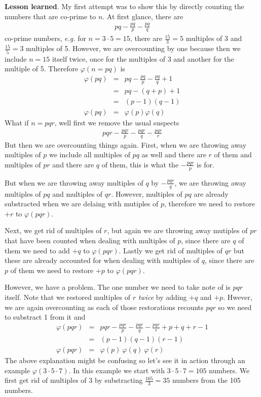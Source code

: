 \documentclass[aps,preprint,preprintnumbers,nofootinbib,showpacs,prd]{revtex4-1}
\newcommand{\eg}{{\it e.g.} }
\newcommand{\nbea}{\begin{eqnarray*}}
\newcommand{\neea}{\end{eqnarray*}}
\begin{document}
{\bf Lesson learned}. My first attempt was to show this by directly counting the numbers that are co-prime to $n$. At first glance, there are
%
\nbea
pq - \frac{pq}{p} - \frac{pq}{q}
\neea
%
co-prime numbers, \eg for $n=3\cdot 5 = 15$, there are $\frac{15}{3} = 5$ multiples of $3$ and $\frac{15}{5} = 3$ multiples of 5. However, we are overcounting by one because then we include $n=15$ itself twice, once for the multiples of 3 and another for the multiple of 5. Therefore $\varphi(n=pq)$ is
%
\nbea
\varphi(pq) & = & pq - \frac{pq}{p} - \frac{pq}{q} + 1 \\
& = & pq - (q+p) + 1 \\
& = & (p-1)(q-1) \\
\varphi(pq) & = & \varphi(p)\varphi(q)
\neea
%
What if $n = pqr$, well first we remove the usual suspects
%
\nbea
pqr - \frac{pqr}{p} - \frac{pqr}{q} - \frac{pqr}{r}
\neea
%
But then we are overcounting things again. First, when we are throwing away multiples of $p$ we include all multiples of $pq$ as well and there are $r$ of them and multiples of $pr$ and there are $q$ of them, this is what the $ - \frac{pqr}{p}$ is for.

But when we are throwing away multiples of $q$ by $- \frac{pqr}{q}$, we are throwing away multiples of $pq$ and multiples of $qr$. However, multiples of $pq$ are already substracted when we are delaing with mutiples of $p$, therefore we need to restore $ + r$ to $\varphi(pqr)$.

Next, we get rid of multiples of $r$, but again we are throwing away mutiples of $pr$ that have been counted when dealing with multiples of $p$, since there are $q$ of them we need to add $+q$ to $\varphi(pqr)$. Lastly we get rid of multiples of $qr$ but these are already accounted for when dealing with multiples of $q$, since there are $p$ of them we need to restore $+p$ to $\varphi(pqr)$.

However, we have a problem. The one number we need to take note of is $pqr$ itself. Note that we restored multiples of $r$ {\it twice} by adding $+q$ and $+p$. Hwever, we are again overcounting as each of those restorations recounts $pqr$ so we need to substract 1 from it and
%
\nbea
\varphi(pqr) & = & pqr - \frac{pqr}{p} - \frac{pqr}{q} - \frac{pqr}{r} + p + q + r - 1 \\
& = & (p-1)(q-1)(r-1) \\
\varphi(pqr) & = & \varphi(p)~\varphi(q)~\varphi(r)
\neea
%
The above explanation might be confusing so let's see it in action through an example $\varphi(3 \cdot 5 \cdot 7)$. In this example we start with $3 \cdot 5 \cdot 7 = 105$ numbers. We first get rid of multiples of 3 by substracting $\frac{105}{3} = 35$ numbers from the 105 numbers.
\end{document}
